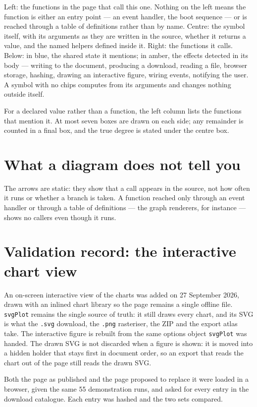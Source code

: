 Left: the functions in the page that call this one. Nothing on the left means the function is either
an entry point --- an event handler, the boot sequence --- or is reached through a table of
definitions rather than by name. Centre: the symbol itself, with its arguments as they are written
in the source, whether it returns a value, and the named helpers defined inside it. Right: the
functions it calls. Below: in blue, the shared state it mentions; in amber, the effects detected in
its body --- writing to the document, producing a download, reading a file, browser storage,
hashing, drawing an interactive figure, wiring events, notifying the user. A symbol with no chips
computes from its arguments and changes nothing outside itself.

For a declared value rather than a function, the left column lists the functions that mention it.
At most seven boxes are drawn on each side; any remainder is counted in a final box, and the true
degree is stated under the centre box.

\section{What a diagram does not tell you}

The arrows are static: they show that a call appears in the source, not how often it runs or whether
a branch is taken. A function reached only through an event handler or through a table of
definitions --- the graph renderers, for instance --- shows no callers even though it runs.

\section{Validation record: the interactive chart view}

An on-screen interactive view of the charts was added on 27 September 2026, drawn with an inlined
chart library so the page remains a single offline file. \texttt{svgPlot} remains the single source
of truth: it still draws every chart, and its SVG is what the \texttt{.svg} download, the
\texttt{.png} rasteriser, the ZIP and the export atlas take. The interactive figure is rebuilt from
the same options object \texttt{svgPlot} was handed. The drawn SVG is not discarded when a figure is
shown: it is moved into a hidden holder that stays first in document order, so an export that reads
the chart out of the page still reads the drawn SVG.

Both the page as published and the page proposed to replace it were loaded in a browser, given the
same 55 demonstration runs, and asked for every entry in the download catalogue. Each entry was
hashed and the two sets compared.

